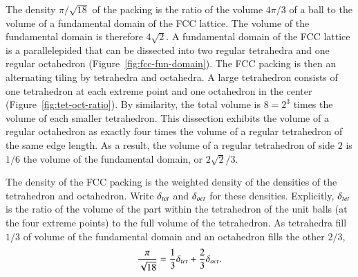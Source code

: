 \figTCFVGTS %



The density $\pi/\sqrt{18}$ of the packing is the ratio of the volume
$4\pi/3$ of a ball to the volume of a fundamental domain of the FCC
lattice.  The volume of the fundamental domain is therefore
$4\sqrt{2}$.  A fundamental domain of the FCC lattice is a
parallelepided that can be dissected into two regular tetrahedra and
one regular octahedron (Figure~\ref{fig:fcc-fun-domain}).  The FCC
packing is then an alternating tiling by tetrahedra and octahedra.  A
large tetrahedron consists of one tetrahedron at each extreme point
and one octahedron in the center (Figure~\ref{fig:tet-oct-ratio}). By
similarity, the total volume is $8 = 2^3$ times the volume of each
smaller tetrahedron. This dissection exhibits the volume of a regular
octahedron as exactly four times the volume of a regular tetrahedron
of the same edge length.  As a result, the volume of a regular
tetrahedron of side $2$ is $1/6$ the volume of the fundamental domain,
or $2\sqrt{2}/3$.

\figSEYIMIE %

\figAZGXQWC %

The density of the FCC packing is the weighted density
of the densities of the tetrahedron and octahedron.  Write $\delta_{tet}$ and
$\delta_{oct}$ for these densities.  Explicitly, $\delta_{tet}$ is the ratio of the
volume of the part within the tetrahedron of the unit balls (at the
four extreme points) to the full volume of the tetrahedron.  As tetrahedra fill
$1/3$ of volume of the fundamental domain and an octahedron fills
the other $2/3$,
\[ 
  \frac{\pi}{\sqrt{18}} = \frac{1}{3}\delta_{tet} + \frac{2}{3}\delta_{oct}.
\] 


